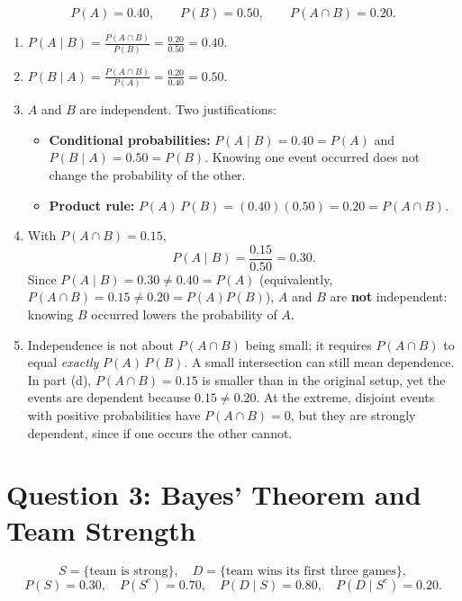 \documentclass[11pt]{article}
\begin{document}
\[
P(A) = 0.40, \qquad P(B) = 0.50, \qquad P(A \cap B) = 0.20.
\]

\begin{enumerate}
\item $\displaystyle P(A \mid B) = \frac{P(A \cap B)}{P(B)} = \frac{0.20}{0.50} = 0.40.$

\item $\displaystyle P(B \mid A) = \frac{P(A \cap B)}{P(A)} = \frac{0.20}{0.40} = 0.50.$

\item $A$ and $B$ are independent. Two justifications:
  \begin{itemize}[itemsep=2pt]
  \item \textbf{Conditional probabilities:} $P(A \mid B) = 0.40 = P(A)$ and $P(B \mid A) = 0.50 = P(B)$. Knowing one event occurred does not change the probability of the other.
  \item \textbf{Product rule:} $P(A)\,P(B) = (0.40)(0.50) = 0.20 = P(A \cap B)$.
  \end{itemize}

\item With $P(A \cap B) = 0.15$,
\[
P(A \mid B) = \frac{0.15}{0.50} = 0.30.
\]
Since $P(A \mid B) = 0.30 \neq 0.40 = P(A)$ (equivalently, $P(A \cap B) = 0.15 \neq 0.20 = P(A)P(B)$), $A$ and $B$ are \textbf{not} independent: knowing $B$ occurred lowers the probability of $A$.

\item Independence is not about $P(A \cap B)$ being small; it requires $P(A \cap B)$ to equal \emph{exactly} $P(A)\,P(B)$. A small intersection can still mean dependence. In part (d), $P(A \cap B) = 0.15$ is smaller than in the original setup, yet the events are dependent because $0.15 \neq 0.20$. At the extreme, disjoint events with positive probabilities have $P(A \cap B) = 0$, but they are strongly dependent, since if one occurs the other cannot.
\end{enumerate}

\section*{Question 3: Bayes' Theorem and Team Strength}

\[
S = \{\text{team is strong}\}, \quad D = \{\text{team wins its first three games}\},
\]
\[
P(S) = 0.30, \quad P(S^c) = 0.70, \quad P(D \mid S) = 0.80, \quad P(D \mid S^c) = 0.20.
\]
\end{document}
